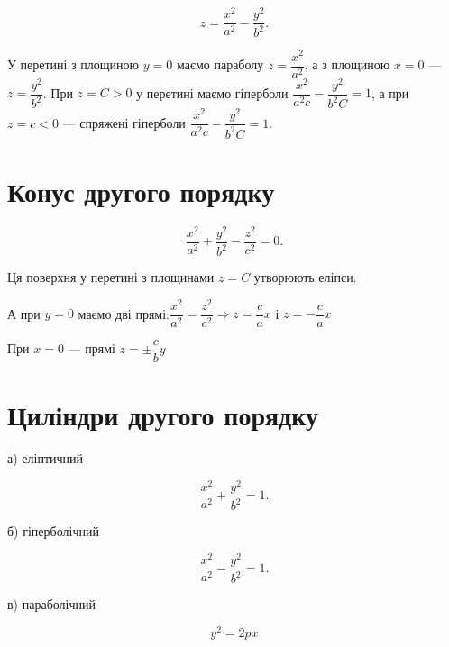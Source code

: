$$z = \dfrac{x^2}{a^2} - \dfrac{y^2}{b^2}.$$

У перетині з площиною $y = 0$ маємо параболу $z = \dfrac{x^2}{a^2}$, а з площиною
$x = 0$ --- $z = \dfrac{y^2}{b^2}$. При $z = C > 0$ у перетині маємо гіперболи
$\dfrac{x^2}{a^2 c} - \dfrac{y^2}{b^2 C} = 1$, а при $z = c < 0$ --- спряжені гіперболи
$\dfrac{x^2}{a^2 c} - \dfrac{y^2}{b^2 C} = 1$.


\section{Конус другого порядку}

$$\dfrac{x^2}{a^2} + \dfrac{y^2}{b^2} - \dfrac{z^2}{c^2} = 0.$$

Ця поверхня у перетині з площинами $z = C$ утворюють еліпси.

А при $y = 0$ маємо дві прямі:$\dfrac{x^2}{a^2} = \dfrac{z^2}{c^2} \Rightarrow
z = \dfrac{c}{a}x$ і $z = - \dfrac{c}{a}x$

При $x = 0$ --- прямі $z = \pm \dfrac{c}{b}y$

\section{Циліндри другого порядку}

а) еліптичний

$$\dfrac{x^2}{a^2} + \dfrac{y^2}{b^2} = 1.$$


б) гіперболічний

$$\dfrac{x^2}{a^2} - \dfrac{y^2}{b^2} = 1.$$


в) параболічний

$$y^2 = 2px$$


